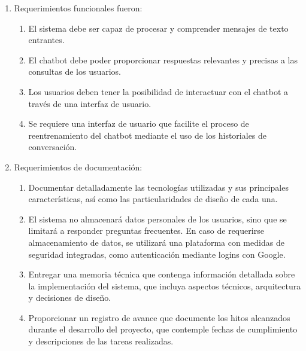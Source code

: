 \begin{enumerate}
    \item Requerimientos funcionales fueron:
        \begin{enumerate}
            \item El sistema debe ser capaz de procesar y comprender mensajes de texto entrantes.
            \item El chatbot debe poder proporcionar respuestas relevantes y precisas a las consultas de los usuarios.
            \item Los usuarios deben tener la posibilidad de interactuar con el chatbot a través de una interfaz de usuario.
            \item Se requiere una interfaz de usuario que facilite el proceso de reentrenamiento del chatbot mediante el uso de los historiales de conversación.
        \end{enumerate}
    \item Requerimientos de documentación:
        \begin{enumerate}
            \item Documentar detalladamente las tecnologías utilizadas y sus principales características, así como las particularidades de diseño de cada una.
            \item El sistema no almacenará datos personales de los usuarios, sino que se limitará a responder preguntas frecuentes. En caso de requerirse almacenamiento de datos, se utilizará una plataforma con medidas de seguridad integradas, como autenticación mediante logins con Google.
            \item Entregar una memoria técnica que contenga información detallada sobre la implementación del sistema, que incluya aspectos técnicos, arquitectura y decisiones de diseño.
            \item Proporcionar un registro de avance que documente los hitos alcanzados durante el desarrollo del proyecto, que contemple fechas de cumplimiento y descripciones de las tareas realizadas.
         \end{enumerate}
		 

\end{enumerate}
